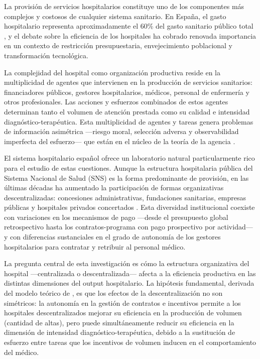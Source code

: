 \documentclass[12pt, a4paper, twoside, openright]{book}
\theoremstyle{plain}
\theoremstyle{definition}
\theoremstyle{remark}
\begin{document}
La provisión de servicios hospitalarios constituye uno de los componentes más complejos y costosos de cualquier sistema sanitario. En España, el gasto hospitalario representa aproximadamente el 60\% del gasto sanitario público total \citep{oecd2023}, y el debate sobre la eficiencia de los hospitales ha cobrado renovada importancia en un contexto de restricción presupuestaria, envejecimiento poblacional y transformación tecnológica.

La complejidad del hospital como organización productiva reside en la multiplicidad de agentes que intervienen en la producción de servicios sanitarios: financiadores públicos, gestores hospitalarios, médicos, personal de enfermería y otros profesionales. Las acciones y esfuerzos combinados de estos agentes determinan tanto el volumen de atención prestada como su calidad e intensidad diagnóstico-terapéutica. Esta multiplicidad de agentes y tareas genera problemas de información asimétrica ---riesgo moral, selección adversa y observabilidad imperfecta del esfuerzo--- que están en el núcleo de la teoría de la agencia \citep{laffont2002,bolton2005}.

El sistema hospitalario español ofrece un laboratorio natural particularmente rico para el estudio de estas cuestiones. Aunque la estructura hospitalaria pública del Sistema Nacional de Salud (SNS) es la forma predominante de provisión, en las últimas décadas ha aumentado la participación de formas organizativas descentralizadas: concesiones administrativas, fundaciones sanitarias, empresas públicas y hospitales privados concertados \citep{repullo2008}. Esta diversidad institucional coexiste con variaciones en los mecanismos de pago ---desde el presupuesto global retrospectivo hasta los contratos-programa con pago prospectivo por actividad--- y con diferencias sustanciales en el grado de autonomía de los gestores hospitalarios para contratar y retribuir al personal médico.

La pregunta central de esta investigación es cómo la estructura organizativa del hospital ---centralizada o descentralizada--- afecta a la eficiencia productiva en las distintas dimensiones del output hospitalario. La hipótesis fundamental, derivada del modelo teórico de \citet{izquierdo2019}, es que los efectos de la descentralización no son simétricos: la autonomía en la gestión de contratos e incentivos permite a los hospitales descentralizados mejorar su eficiencia en la producción de volumen (cantidad de altas), pero puede simultáneamente reducir su eficiencia en la dimensión de intensidad diagnóstico-terapéutica, debido a la sustitución de esfuerzo entre tareas que los incentivos de volumen inducen en el comportamiento del médico.
\end{document}
